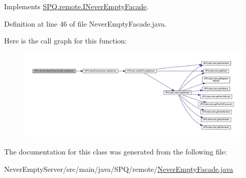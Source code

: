 Implements \mbox{\hyperlink{interface_s_p_q_1_1remote_1_1_i_never_empty_facade_add6dafb25f59c549e924c76c6e8f31c6}{S\+P\+Q.\+remote.\+I\+Never\+Empty\+Facade}}.



Definition at line 46 of file Never\+Empty\+Facade.\+java.

Here is the call graph for this function\+:
\nopagebreak
\begin{figure}[H]
\begin{center}
\leavevmode
\includegraphics[width=350pt]{class_s_p_q_1_1remote_1_1_never_empty_facade_a55ad685d3c176424a7f5f18e5ebe043b_cgraph}
\end{center}
\end{figure}


The documentation for this class was generated from the following file\+:\begin{DoxyCompactItemize}
\item 
Never\+Empty\+Server/src/main/java/\+S\+P\+Q/remote/\mbox{\hyperlink{_never_empty_facade_8java}{Never\+Empty\+Facade.\+java}}\end{DoxyCompactItemize}

